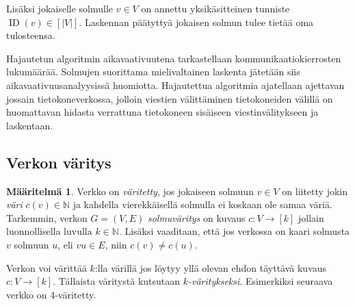 \documentclass[finnish]{tktltiki2}
\theoremstyle{definition}
\newtheorem{maar}[lau]{Määritelmä}
\theoremstyle{remark}
\newcommand{\nat}{\mathbb{N}}
\newcommand{\from}{\colon}
\DeclareMathOperator{\id}{ID}
\begin{document}
Lisäksi jokaiselle solmulle $v \in V$ on annettu yksikäsitteinen tunniste
$\id(v) \in [|V|]$. Laskennan päätyttyä jokaisen solmun tulee
tietää oma tulosteensa.

Hajautetun algoritmin aikavaativuutena tarkastellaan kommunikaatiokierrosten
lukumäärää. Solmujen suorittama mielivaltainen laskenta jä\-te\-tään siis
aikavaativuusanalyysissä huomiotta. Hajautettua algoritmia ajatellaan ajettavan
jossain tietokoneverkossa, jolloin viestien välittäminen tietokoneiden välillä
on huomattavan hidasta verrattuna tietokoneen sisäiseen viestinvälitykseen ja
laskentaan.

\subsection{Verkon väritys}

\begin{maar}
    Verkko on \emph{väritetty}, jos jokaiseen solmuun $v \in V$ on liitetty
    jokin \emph{väri} $c(v) \in \nat$ ja kahdella vierekkäisellä solmulla ei
    koskaan ole samaa väriä.  Tarkemmin, verkon $G = (V,E)$ \emph{solmuväritys}
    on kuvaus $c \from V \to [k]$ jollain luonnollisella luvulla $k \in \nat$.
    Lisäksi vaaditaan, että jos verkossa on kaari solmusta $v$ solmuun $u$, eli
    $vu \in E$, niin $c(v) \neq c(u)$.
\end{maar}

Verkon voi värittää $k$:lla värillä jos löytyy yllä olevan ehdon täyttävä
kuvaus $c \from V \to [k]$. Tällaista väritystä kutsutaan
\emph{$k$-väritykseksi}. Esimerkiksi seuraava verkko on 4-väritetty.



\begin{center}
\end{center}
\end{document}
